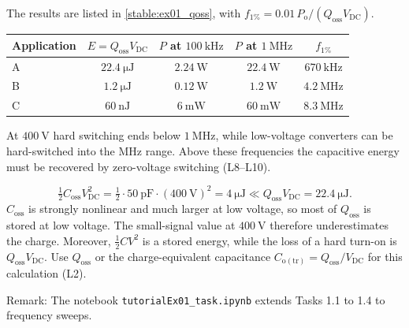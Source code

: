 
\begin{solutionblock}
	The results are listed in \autoref{stable:ex01_qoss}, with $f_{1\%}=0.01\,P_\mathrm{o}/(Q_\mathrm{oss}V_\mathrm{DC})$.
	\begin{solutiontable}[ht]
		\centering
		\begin{tabular}{lcccc}
			\toprule
			Application & $E=Q_\mathrm{oss}V_\mathrm{DC}$ & $P$ at $\SI{100}{\kilo\hertz}$ & $P$ at $\SI{1}{\mega\hertz}$ & $f_{1\%}$ \\
			\midrule
			A & $\SI{22.4}{\micro\joule}$ & $\SI{2.24}{\watt}$  & $\SI{22.4}{\watt}$ & $\SI{670}{\kilo\hertz}$ \\
			B & $\SI{1.2}{\micro\joule}$  & $\SI{0.12}{\watt}$  & $\SI{1.2}{\watt}$  & $\SI{4.2}{\mega\hertz}$ \\
			C & $\SI{60}{\nano\joule}$    & $\SI{6}{\milli\watt}$ & $\SI{60}{\milli\watt}$ & $\SI{8.3}{\mega\hertz}$ \\
			\bottomrule
		\end{tabular}
		\caption{Capacitive switching loss of the three applications.}
		\label{stable:ex01_qoss}
	\end{solutiontable}
	At $\SI{400}{\volt}$ hard switching ends below $\SI{1}{\mega\hertz}$, while low-voltage converters can be hard-switched into the MHz range. Above these frequencies the capacitive energy must be recovered by zero-voltage switching (L8--L10).
\end{solutionblock}


\begin{solutionblock}
	\begin{equation}
		\tfrac{1}{2}C_\mathrm{oss}V_\mathrm{DC}^2 = \tfrac{1}{2}\cdot\SI{50}{\pico\farad}\cdot(\SI{400}{\volt})^2 = \SI{4}{\micro\joule} \ll Q_\mathrm{oss}V_\mathrm{DC} = \SI{22.4}{\micro\joule}.
	\end{equation}
	$C_\mathrm{oss}$ is strongly nonlinear and much larger at low voltage, so most of $Q_\mathrm{oss}$ is stored at low voltage. The small-signal value at $\SI{400}{\volt}$ therefore underestimates the charge. Moreover, $\frac{1}{2}CV^2$ is a stored energy, while the loss of a hard turn-on is $Q_\mathrm{oss}V_\mathrm{DC}$. Use $Q_\mathrm{oss}$ or the charge-equivalent capacitance $C_\mathrm{o(tr)}=Q_\mathrm{oss}/V_\mathrm{DC}$ for this calculation (L2).
\end{solutionblock}

\vspace{0.5cm}
Remark: The notebook \texttt{tutorialEx01\_task.ipynb} extends Tasks 1.1 to 1.4 to frequency sweeps.
